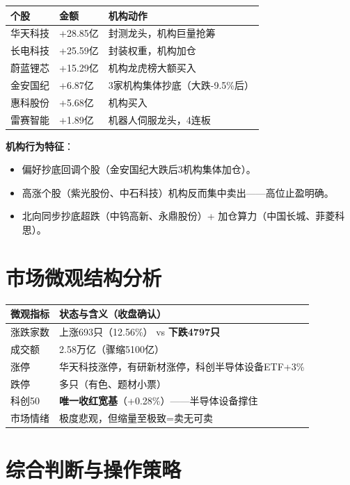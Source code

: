 \documentclass[a4paper,11pt,fontset=none]{ctexart}
\begin{document}
\begin{tabularx}{\textwidth}{L{3cm}L{2cm}X}
\toprule
\textbf{个股} & \textbf{金额} & \textbf{机构动作} \\
\midrule
华天科技 & +28.85亿 & 封测龙头，机构巨量抢筹 \\
长电科技 & +25.59亿 & 封装权重，机构加仓 \\
蔚蓝锂芯 & +15.29亿 & 机构龙虎榜大额买入 \\
金安国纪 & +6.87亿 & 3家机构集体抄底（大跌-9.5\%后） \\
惠科股份 & +5.68亿 & 机构买入 \\
雷赛智能 & +1.89亿 & 机器人伺服龙头，4连板 \\
\bottomrule
\end{tabularx}

\textbf{机构行为特征}：
\begin{itemize}
  \item 偏好抄底回调个股（金安国纪大跌后3机构集体加仓）。
  \item 高涨个股（紫光股份、中石科技）机构反而集中卖出——高位止盈明确。
  \item 北向同步抄底超跌（中钨高新、永鼎股份）+ 加仓算力（中国长城、菲菱科思）。
\end{itemize}

\section{市场微观结构分析}

\begin{tabularx}{\textwidth}{L{4cm}X}
\toprule
\textbf{微观指标} & \textbf{状态与含义（收盘确认）} \\
\midrule
涨跌家数 & 上涨693只（12.56\%） vs \textbf{下跌4797只} \\
成交额 & 2.58万亿（骤缩5100亿） \\
涨停 & 华天科技涨停，有研新材涨停，科创半导体设备ETF+3\% \\
跌停 & 多只（有色、题材小票） \\
科创50 & \textbf{唯一收红宽基}（+0.28\%）——半导体设备撑住 \\
市场情绪 & 极度悲观，但缩量至极致=卖无可卖 \\
\bottomrule
\end{tabularx}

\section{综合判断与操作策略}
\end{document}

